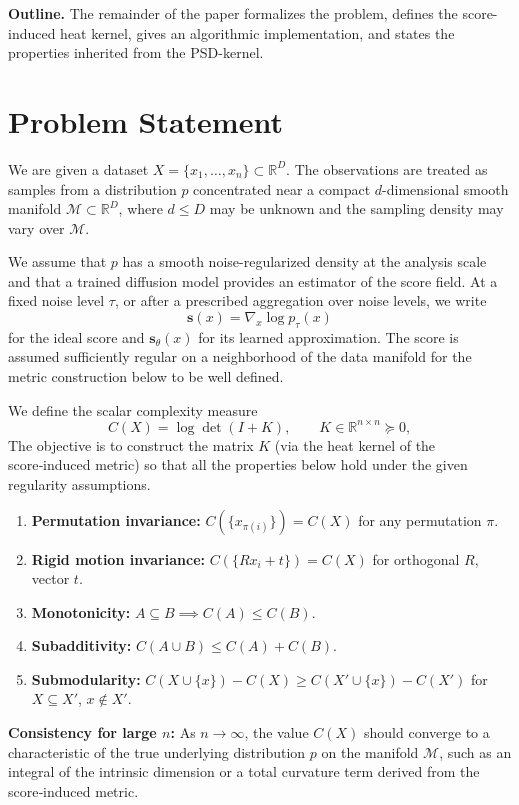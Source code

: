 \documentclass{article}
\begin{document}
\textbf{Outline.} The remainder of the paper formalizes the problem, defines the score-induced heat kernel, gives an algorithmic implementation, and states the properties inherited from the PSD-kernel.


\section{Problem Statement}
We are given a dataset \(X=\{x_1,\ldots,x_n\}\subset \mathbb{R}^D\). The observations are treated as samples from a distribution \(p\) concentrated near a compact \(d\)-dimensional smooth manifold \(\mathcal{M}\subset \mathbb{R}^D\), where \(d\leq D\) may be unknown and the sampling density may vary over \(\mathcal{M}\). 

We assume that \(p\) has a smooth noise-regularized density at the analysis scale and that a trained diffusion model provides an estimator of the score field. At a fixed noise level \(\tau\), or after a prescribed aggregation over noise levels, we write
\[
\mathbf{s} (x)=\nabla_x\log p_\tau(x)
\]
for the ideal score and \(\mathbf{s}_\theta(x)\) for its learned approximation. The score is assumed sufficiently regular on a neighborhood of the data manifold for the metric construction below to be well defined.

We define the scalar complexity measure
\[
C(X)=\log\det(I+K),\qquad K\in\mathbb{R}^{n\times n}\succeq 0,
\]
The objective is to construct the matrix \(K\) (via the heat kernel of the score‑induced metric) so that all the properties below hold under the given regularity assumptions.  

\begin{enumerate}
    \item \textbf{Permutation invariance:} $C(\{x_{\pi(i)}\})=C(X)$ for any permutation $\pi$.
    \item \textbf{Rigid motion invariance:} $C(\{R x_i+t\})=C(X)$ for orthogonal $R$, vector $t$.
    \item \textbf{Monotonicity:} $A\subseteq B \implies C(A)\le C(B)$.
    \item \textbf{Subadditivity:} $C(A\cup B)\le C(A)+C(B)$.
    \item \textbf{Submodularity:} $C(X\cup\{x\})-C(X)\ge C(X'\cup\{x\})-C(X')$ for $X\subseteq X'$, $x\notin X'$.
\end{enumerate}
    \textbf{Consistency for large \(n\):}
    As \(n\to\infty\), the value \(C(X)\) should converge to a characteristic of the true underlying distribution \(p\) on the manifold \(\mathcal{M}\), such as an integral of the intrinsic dimension or a total curvature term derived from the score‑induced metric.
\end{document}
